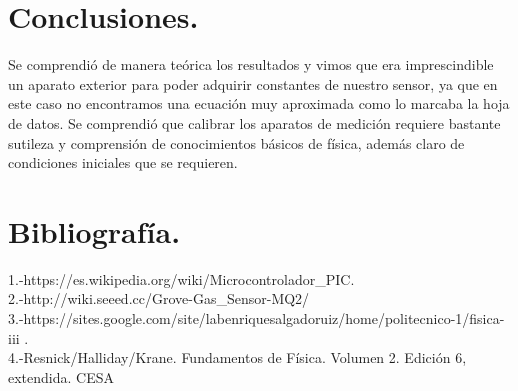\documentclass[11pt,a4paper]{article}
\begin{document}
\section{Conclusiones.}
Se comprendi\'{o} de manera te\'{o}rica los resultados y vimos que era imprescindible un aparato exterior para poder adquirir constantes de nuestro sensor, ya que en este caso no encontramos una ecuaci\'{o}n muy aproximada  como lo marcaba la hoja de datos. Se comprendi\'{o} que calibrar los aparatos de medici\'{o}n requiere bastante sutileza y comprensi\'{o}n de conocimientos b\'{a}sicos de f\'{i}sica, adem\'{a}s claro de condiciones iniciales que se requieren.   
 \section{Bibliograf\'{i}a.}
1.-https://es.wikipedia.org/wiki/Microcontrolador_PIC.\\
2.-http://wiki.seeed.cc/Grove-Gas_Sensor-MQ2/\\
3.-https://sites.google.com/site/labenriquesalgadoruiz/home/politecnico-1/fisica-iii .\\
4.-Resnick/Halliday/Krane. Fundamentos de F\'{i}sica. Volumen 2. Edici\'{o}n 6, extendida. CESA\\

\end{document}
